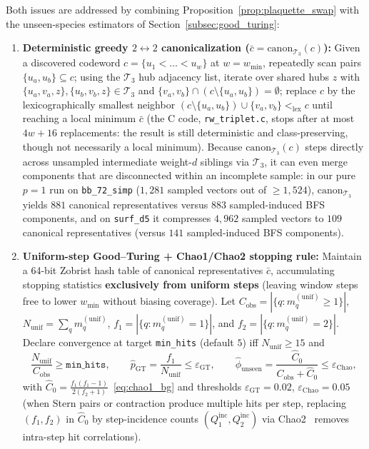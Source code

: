 \documentclass[12pt]{article}
\theoremstyle{definition}
\newcommand{\Tc}{\mathcal{T}_3}
\newcommand{\ttt}[1]{\texttt{#1}}
\begin{document}
Both issues are addressed by combining Proposition~\ref{prop:plaquette_swap} with the unseen-species estimators of
Section~\ref{subsec:good_turing}:
\begin{enumerate}[label=(\arabic*)]
  \item \textbf{Deterministic greedy $2 \leftrightarrow 2$ canonicalization ($\bar{c} =
    \mathrm{canon}_{\Tc}(c)$):} Given a discovered codeword $c = \{u_1 < \dots < u_w\}$ at $w = w_{\min}$,
    repeatedly scan pairs $\{u_a, u_b\} \subseteq c$; using the $\Tc$ hub adjacency list, iterate over shared hubs
    $z$ with $\{u_a, v_a, z\}, \{u_b, v_b, z\} \in \Tc$ and $\{v_a, v_b\} \cap (c \setminus \{u_a, u_b\}) =
    \emptyset$; replace $c$ by the lexicographically smallest neighbor $(c \setminus \{u_a, u_b\}) \cup \{v_a,
    v_b\} <_{\mathrm{lex}} c$ until reaching a local minimum $\bar{c}$ (the C code, \ttt{rw\_triplet.c}, stops after
    at most $4w + 16$ replacements: the result is still deterministic and class-preserving, though not necessarily a
    local minimum). Because $\mathrm{canon}_{\Tc}(c)$ steps
    directly across unsampled intermediate weight-$d$ siblings via $\Tc$, it can even merge components that are
    disconnected within an incomplete sample: in our pure $p = 1$ run on \ttt{bb\_72\_simp} ($1{,}281$ sampled
    vectors out of $\ge 1{,}524$), $\mathrm{canon}_{\Tc}$ yields $881$ canonical representatives versus $883$
    sampled-induced BFS components, and on \ttt{surf\_d5} it compresses $4{,}962$ sampled vectors to $109$ canonical
    representatives (versus $141$ sampled-induced BFS components).
  \item \textbf{Uniform-step Good--Turing + Chao1/Chao2 stopping rule:} Maintain a 64-bit Zobrist hash
    table of canonical representatives $\bar{c}$, accumulating stopping statistics \textbf{exclusively from
    uniform steps} (leaving window steps free to lower $w_{\min}$ without biasing coverage). Let
    $C_{\mathrm{obs}} = |\{q : m_q^{(\mathrm{unif})} \ge 1\}|$, $N_{\mathrm{unif}} = \sum_q m_q^{(\mathrm{unif})}$,
    $f_1 = |\{q : m_q^{(\mathrm{unif})} = 1\}|$, and $f_2 = |\{q : m_q^{(\mathrm{unif})} = 2\}|$. Declare
    convergence at target \ttt{min\_hits} (default $5$) iff $N_{\mathrm{unif}} \ge 15$ and
    \begin{equation}\label{eq:stopping_rule}
      \frac{N_{\mathrm{unif}}}{C_{\mathrm{obs}}} \ge \ttt{min\_hits}, \qquad
      \hat{p}_{\mathrm{GT}} = \frac{f_1}{N_{\mathrm{unif}}} \le \varepsilon_{\mathrm{GT}}, \qquad
      \hat{\phi}_{\mathrm{unseen}} = \frac{\hat{C}_0}{C_{\mathrm{obs}} + \hat{C}_0} \le \varepsilon_{\mathrm{Chao}},
    \end{equation}
    with $\hat{C}_0 = \frac{f_1(f_1 - 1)}{2(f_2 + 1)}$~\eqref{eq:chao1_bg} and thresholds $\varepsilon_{\mathrm{GT}}
    = 0.02$, $\varepsilon_{\mathrm{Chao}} = 0.05$ (when Stern pairs or contraction produce multiple hits per step,
    replacing $(f_1, f_2)$ in $\hat{C}_0$ by step-incidence counts $(Q_1^{\mathrm{inc}}, Q_2^{\mathrm{inc}})$ via
    Chao2~\cite{Chao1987,ChiuWangWaltherChao2014} removes intra-step hit correlations).
\end{enumerate}
\end{document}
